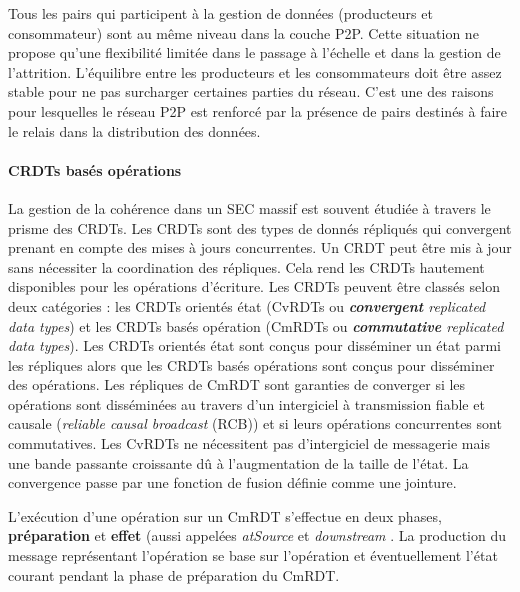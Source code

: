 Tous les pairs qui participent à la gestion de 
données (producteurs et consommateur) sont au même 
niveau dans la couche \gls{P2P}. Cette situation ne propose qu'une flexibilité 
limitée dans le passage à l'échelle et dans la gestion de l'attrition. L'équilibre entre 
les producteurs 
et les consommateurs doit être assez stable pour ne pas surcharger certaines 
parties du réseau. C'est une des raisons pour lesquelles le réseau 
\gls{P2P} est renforcé par la présence de pairs destinés à 
faire le relais dans la distribution des données. 


\paragraph{\glspl{CRDT} basés opérations}
La gestion de la cohérence dans un \gls{SEC} massif est souvent étudiée à 
travers le prisme des \glspl{CRDT}. Les \glspl{CRDT} sont des 
types de 
donnés répliqués qui convergent prenant en compte des mises à jours 
concurrentes. 
Un \gls{CRDT} peut être mis à jour sans nécessiter la coordination des répliques. 
Cela rend les \glspl{CRDT} hautement disponibles pour les opérations d'écriture. 
Les \glspl{CRDT} peuvent être classés selon deux catégories : les \glspl{CRDT} 
orientés état (CvRDTs ou \textit{\textbf{convergent} replicated data types}) et les 
\glspl{CRDT} basés opération (CmRDTs ou\textit{ \textbf{commutative} replicated 
data types}). Les \glspl{CRDT} orientés état sont conçus pour disséminer un 
état parmi les répliques alors que les \glspl{CRDT} basés opérations sont conçus 
pour disséminer des opérations.
Les répliques de CmRDT sont garanties de converger si les opérations sont 
disséminées au travers d'un intergiciel à transmission fiable et causale 
(\textit{reliable causal broadcast} (RCB)) et si leurs opérations concurrentes sont 
commutatives.
Les CvRDTs ne nécessitent pas d'intergiciel de messagerie mais une bande 
passante croissante dû à l'augmentation de la taille de l'état. La convergence 
passe par une fonction de fusion définie comme une jointure.

L'exécution d'une opération sur un CmRDT s'effectue en deux phases, 
\textbf{préparation} et \textbf{effet} (aussi appelées \textit{atSource} et 
\textit{downstream} \cite{Shapiro2011}. La production du message représentant 
l'opération se base sur l'opération et éventuellement l'état courant pendant la 
phase de préparation du CmRDT.

